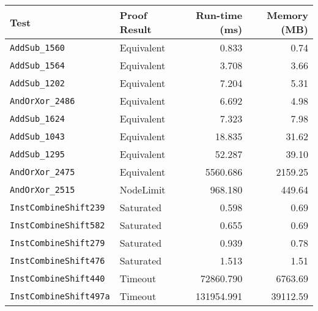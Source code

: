 \begin{tabular}{llrr}
\toprule
\textbf{Test} & \textbf{Proof Result} & \textbf{Run-time (ms)} & \textbf{Memory (MB)} \\
\midrule
\texttt{AddSub\_1560} & Equivalent & 0.833 & 0.74 \\
\texttt{AddSub\_1564} & Equivalent & 3.708 & 3.66 \\
\texttt{AddSub\_1202} & Equivalent & 7.204 & 5.31 \\
\texttt{AndOrXor\_2486} & Equivalent & 6.692 & 4.98 \\
\texttt{AddSub\_1624} & Equivalent & 7.323 & 7.98 \\
\texttt{AddSub\_1043} & Equivalent & 18.835 & 31.62 \\
\texttt{AddSub\_1295} & Equivalent & 52.287 & 39.10 \\
\texttt{AndOrXor\_2475} & Equivalent & 5560.686 & 2159.25 \\
\texttt{AndOrXor\_2515} & NodeLimit & 968.180 & 449.64 \\
\texttt{InstCombineShift239} & Saturated & 0.598 & 0.69 \\
\texttt{InstCombineShift582} & Saturated & 0.655 & 0.69 \\
\texttt{InstCombineShift279} & Saturated & 0.939 & 0.78 \\
\texttt{InstCombineShift476} & Saturated & 1.513 & 1.51 \\
\texttt{InstCombineShift440} & Timeout & 72860.790 & 6763.69 \\
\texttt{InstCombineShift497a} & Timeout & 131954.991 & 39112.59 \\
\bottomrule
\end{tabular}
